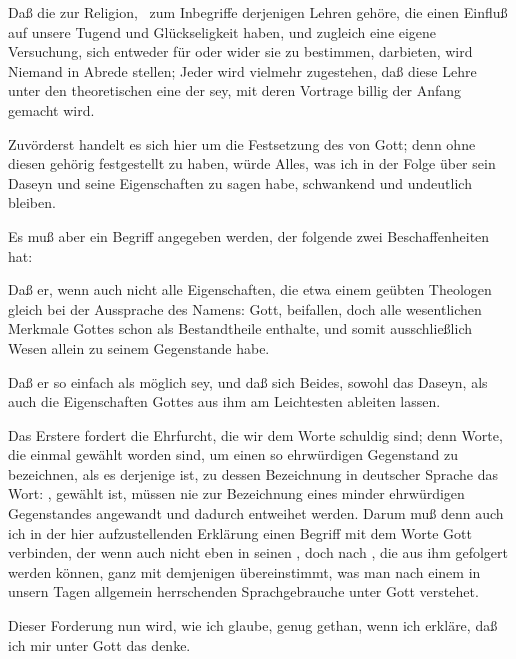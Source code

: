 \begin{aufza} 
\item Daß die  zur Religion, \dh\ zum Inbegriffe derjenigen Lehren gehöre, die einen Einfluß auf unsere Tugend und Glückseligkeit haben, und zugleich eine eigene Versuchung, sich entweder für oder wider sie zu bestimmen, darbieten, wird Niemand in Abrede stellen; Jeder wird vielmehr zugestehen, daß diese Lehre unter den theoretischen eine der  sey, mit deren Vortrage billig der Anfang gemacht wird.~
\item Zuvörderst handelt es sich hier um die Festsetzung des  von Gott; denn ohne diesen gehörig festgestellt zu haben, würde Alles, was ich in der Folge über sein Daseyn und seine Eigenschaften zu sagen habe, schwankend und undeutlich bleiben.
\item Es muß aber ein Begriff angegeben werden, der folgende zwei Beschaffenheiten hat:
\begin{aufzb}
\item Daß er, wenn auch nicht alle Eigenschaften, die etwa einem geübten Theologen gleich bei der Aussprache des Namens: Gott, beifallen, doch alle wesentlichen Merkmale Gottes schon als Bestandtheile enthalte, und somit ausschließlich  Wesen allein zu seinem Gegenstande habe.
\item Daß er so einfach als möglich sey, und daß sich Beides, sowohl das Daseyn, als auch die Eigenschaften Gottes aus ihm am Leichtesten ableiten lassen.
\end{aufzb}
\begin{RWanm}
Das Erstere fordert die Ehrfurcht, die wir dem Worte schuldig sind; denn Worte, die einmal gewählt worden sind, um einen so ehrwürdigen Gegenstand zu bezeichnen, als es derjenige ist, zu dessen Bezeichnung in deutscher Sprache das Wort: , gewählt ist, müssen nie zur Bezeichnung eines minder ehrwürdigen Gegenstandes angewandt und dadurch entweihet werden. Darum muß denn auch ich in der hier aufzustellenden Erklärung einen Begriff mit dem Worte Gott verbinden, der wenn auch nicht eben in seinen , doch nach , die aus ihm gefolgert werden können, ganz mit demjenigen übereinstimmt, was man nach einem in unsern Tagen allgemein herrschenden Sprachgebrauche unter Gott verstehet.
\end{RWanm}
\item Dieser Forderung nun wird, wie ich glaube, genug gethan, wenn ich erkläre, daß ich mir unter Gott das  denke.

\end{aufza}
